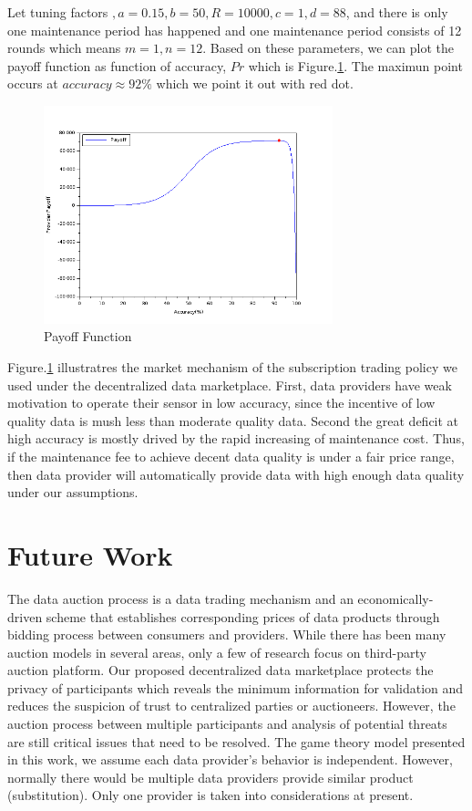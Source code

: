 \documentclass[journal,10pt,a4paper]{IEEEtran}
\begin{document}
Let tuning factors $, a = 0.15, b = 50, R = 10000, c = 1, d = 88$, and there is only one maintenance period has happened and one maintenance period consists of 12 rounds which means $m = 1, n = 12$. Based on these parameters, we can plot the payoff function as function of accuracy, $Pr$ which is Figure.\ref{fig:payoff_pic}. The maximun point occurs at $accuracy \approx 92\%$ which we point it out with red dot.
\begin{figure} \centering \includegraphics[width=3.3in]{payoff_pic} \caption{Payoff Function}
    \label{fig:payoff_pic} \end{figure}

Figure.\ref{fig:payoff_pic} illustratres the market mechanism of the subscription trading policy we used under the decentralized data marketplace. First, data providers have weak motivation to operate their sensor in low accuracy, since the incentive of low quality data is mush less than moderate quality data. Second the great deficit at high accuracy is mostly drived by the rapid increasing of maintenance cost. Thus, if the maintenance fee to achieve decent data quality is under a fair price range, then data provider will automatically provide data with high enough data quality under our assumptions.

\section{\normalsize\textbf{Future Work}}
The data auction process is a data trading mechanism and an economically-driven scheme that establishes corresponding prices of data products through bidding process between consumers and providers. While there has been many auction models\cite{BigPicDataMarket} in several areas, only a few of research focus on third-party auction platform. Our proposed decentralized data marketplace protects the privacy of participants which reveals the minimum information for validation and reduces the suspicion of trust to centralized parties or auctioneers. However, the auction process between multiple participants and analysis of potential threats are still critical issues that need to be resolved. The game theory model presented in this work, we assume each data provider's behavior is independent. However, normally there would be multiple data providers provide similar product (substitution). Only one provider is taken into considerations at present.

 


\end{document}
